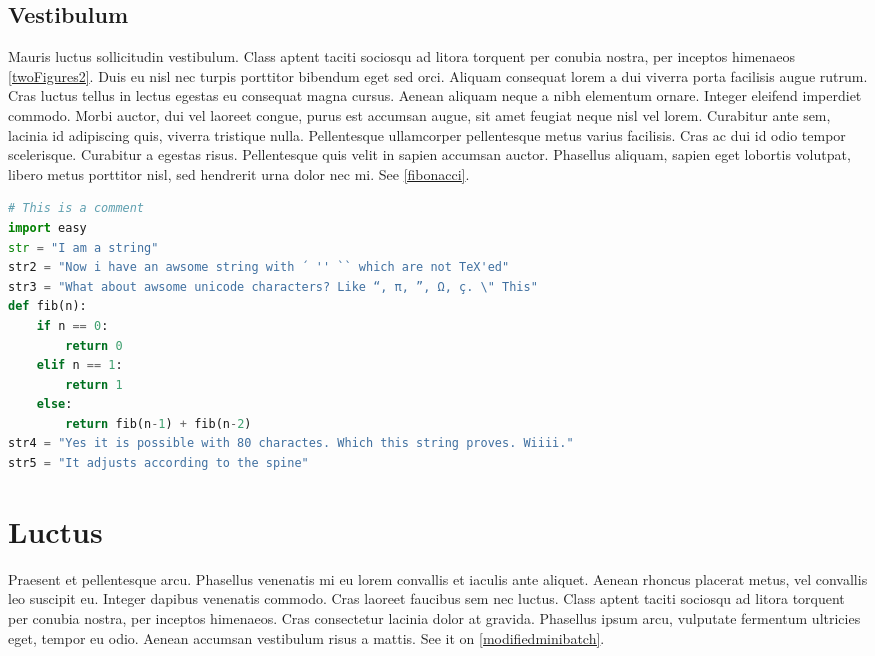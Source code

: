 \subsection{Vestibulum}
Mauris luctus sollicitudin vestibulum. Class aptent taciti sociosqu ad litora torquent per conubia nostra, per inceptos himenaeos \cref{twoFigures2}. Duis eu nisl nec turpis porttitor bibendum eget sed orci. Aliquam consequat lorem a dui viverra porta facilisis augue rutrum. Cras luctus tellus in lectus egestas eu consequat magna cursus. Aenean aliquam neque a nibh elementum ornare. Integer eleifend imperdiet commodo. Morbi auctor, dui vel laoreet congue, purus est accumsan augue, sit amet feugiat neque nisl vel lorem. Curabitur ante sem, lacinia id adipiscing quis, viverra tristique nulla. Pellentesque ullamcorper pellentesque metus varius facilisis. Cras ac dui id odio tempor scelerisque. Curabitur a egestas risus. Pellentesque quis velit in sapien accumsan auctor. Phasellus aliquam, sapien eget lobortis volutpat, libero metus porttitor nisl, sed hendrerit urna dolor nec mi. See \cref{fibonacci}.

\begin{adjustwidth*}{0cm}{-0.4cm}
\begin{lstlisting}[language=Python,caption=Fibonacci,label=fibonacci]
# This is a comment
import easy
str = "I am a string"
str2 = "Now i have an awsome string with ´ '' `` which are not TeX'ed"
str3 = "What about awsome unicode characters? Like “, π, ”, Ω, ç. \" This"
def fib(n):
    if n == 0:
        return 0
    elif n == 1:
        return 1
    else:
        return fib(n-1) + fib(n-2)
str4 = "Yes it is possible with 80 charactes. Which this string proves. Wiiii."
str5 = "It adjusts according to the spine"
\end{lstlisting}
\end{adjustwidth*}

\section{Luctus}
Praesent et pellentesque arcu. Phasellus venenatis mi eu lorem convallis et iaculis ante aliquet. Aenean rhoncus placerat metus, vel convallis leo suscipit eu. Integer dapibus venenatis commodo. Cras laoreet faucibus sem nec luctus. Class aptent taciti sociosqu ad litora torquent per conubia nostra, per inceptos himenaeos. Cras consectetur lacinia dolor at gravida. Phasellus ipsum arcu, vulputate fermentum ultricies eget, tempor eu odio. Aenean accumsan vestibulum risus a mattis. See it on \cref{modifiedminibatch}.

